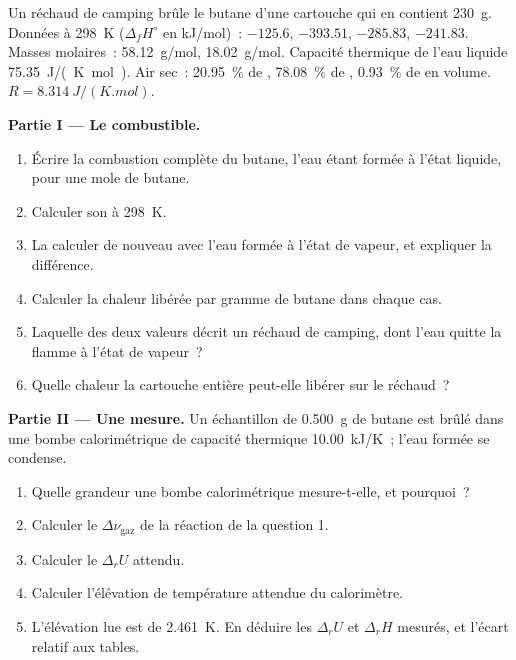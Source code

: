 \begin{problem}
\label{pb:b2:reaction-enthalpy:1}
Un réchaud de camping brûle le butane d'une cartouche qui en contient \qty{230}{g}.
Données à \qty{298}{K} ($\Delta_f H^\circ$ en \unit{kJ/mol})~: 
$-125.6$,  $-393.51$,  $-285.83$, 
$-241.83$. Masses molaires~:  \qty{58.12}{g/mol}, 
\qty{18.02}{g/mol}. Capacité thermique de l'eau liquide
\qty{75.35}{J/(K.mol)}. Air sec~: \qty{20.95}{\percent} de ,
\qty{78.08}{\percent} de , \qty{0.93}{\percent} de  en volume. $R = \qty{8.314}{J/(K.mol)}$.

\medskip
\noindent\textbf{Partie I --- Le combustible.}
\begin{enumerate}
  \item Écrire la combustion complète du butane, l'eau étant formée à l'état liquide,
        pour une mole de butane.
  \item Calculer son  à \qty{298}{K}.
  \item La calculer de nouveau avec l'eau formée à l'état de vapeur, et expliquer la
        différence.
  \item Calculer la chaleur libérée par gramme de butane dans chaque cas.
  \item Laquelle des deux valeurs décrit un réchaud de camping, dont l'eau
        quitte la flamme à l'état de vapeur~?
  \item Quelle chaleur la cartouche entière peut-elle libérer sur le réchaud~?
\end{enumerate}

\medskip
\noindent\textbf{Partie II --- Une mesure.}
Un échantillon de \qty{0.500}{g} de butane est brûlé dans une bombe calorimétrique de
capacité thermique \qty{10.00}{kJ/K}~; l'eau formée se condense.
\begin{enumerate}[resume]
  \item Quelle grandeur une bombe calorimétrique mesure-t-elle, et pourquoi~?
  \item Calculer le $\Delta\nu_{\text{gaz}}$ de la réaction de la question 1.
  \item Calculer le $\Delta_r U$ attendu.
  \item Calculer l'élévation de température attendue du calorimètre.
  \item L'élévation lue est de \qty{2.461}{K}. En déduire les $\Delta_r U$
        et $\Delta_r H$ mesurés, et l'écart relatif aux tables.
\end{enumerate}


\end{problem}
